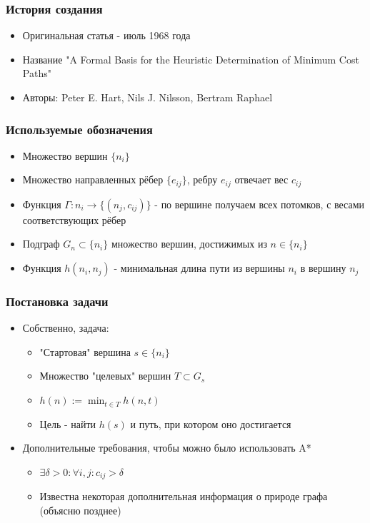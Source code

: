 \documentclass{style}
\begin{document}
 
\begin{frame}[plain]
    \titlepage
\end{frame}

\begin{frame}
    \frametitle{История создания}
    \begin{itemize}
        \item Оригинальная статья - июль 1968 года
        \item Название "A Formal Basis for the Heuristic Determination of Minimum Cost Paths"
        \item Авторы: Peter E. Hart, Nils J. Nilsson, Bertram Raphael
    \end{itemize}
\end{frame}

\begin{frame}
    \frametitle{Используемые обозначения}
    \begin{itemize}
        \item Множество вершин $\{n_i\}$
        \item Множество направленных рёбер $\{e_{ij}\}$, ребру $e_{ij}$ отвечает вес $c_{ij}$
        \item Функция $\Gamma : n_i \rightarrow \{(n_j, c_{ij})\}$ - по вершине получаем всех 
              потомков, с весами соответствующих рёбер
        \item Подграф $G_n \subset \{n_i\}$ множество вершин, достижимых из $n \in \{n_i\}$ 
        \item Функция $h(n_i, n_j)$ - минимальная длина пути из вершины $n_i$ в вершину $n_j$
    \end{itemize}
\end{frame}

\begin{frame}
    \frametitle{Постановка задачи}
    \begin{itemize}
        \item Собственно, задача:
        \begin{itemize}
            \item "Стартовая" \; вершина $s \in \{n_i\}$
            \item Множество "целевых" \; вершин $T \subset G_s$
            \item \(\displaystyle h(n) := \min _{t \in T} h(n, t) \)
            \item Цель - найти $h(s)$ и путь, при котором оно достигается
        \end{itemize}
        \item Дополнительные требования, чтобы можно было использовать A*
        \begin{itemize}
            \item $\exists \delta > 0 : \forall i,j : c_{ij} > \delta$
            \item Известна некоторая дополнительная информация о природе графа (объясню позднее)
        \end{itemize}
    \end{itemize}
\end{frame}
\end{document}
